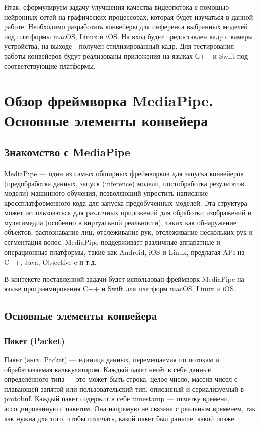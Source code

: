 \documentclass[a4paper,14pt]{extreport}
\begin{document}
    Итак, сформулируем задачу улучшения качества видеопотока с помощью нейронных сетей на графических процессорах, которая будет изучаться в данной работе. Необходимо разработать конвейеры для инференса выбранных моделей под платформы macOS, Linux и iOS. На вход будет предоставлен кадр с камеры устройства, на выходе - получен стилизированный кадр. Для тестирования работы конвейеров будут реализованы приложения на языках С++ и Swift под соответствующие платформы.

    \chapter{Обзор фреймворка MediaPipe. Основные элементы конвейера}
        \section{Знакомство с MediaPipe}
        MediaPipe — один из самых обширных фреймворков для запуска конвейеров (предобработка данных, запуск (inference) модели, постобработка результатов модели) машинного обучения, позволяющий упростить написание кроссплатформенного кода для запуска предобученных моделей. Эта структура может использоваться для различных приложений для обработки изображений и мультимедиа (особенно в виртуальной реальности), таких как обнаружение объектов, распознавание лиц, отслеживание рук, отслеживание нескольких рук и сегментация волос. MediaPipe поддерживает различные аппаратные и операционные платформы, такие как Android, iOS и Linux, предлагая API на C++, Java, Objective-c и т.д.

        В контексте поставленной задачи будет использован фреймворк MediaPipe на языке программирования C++ и Swift для платформ macOS, Linux и iOS.
        
        \section{Основные элементы конвейера}
        \subsection{Пакет (Packet)}
        Пакет (англ. Packet) — единица данных, перемещаемая по потокам и обрабатываемая калькулятором. Каждый пакет несёт в себе данные определённого типа — это может быть строка, целое число, массив чисел с плавающей запятой или пользовательский тип, описанный и сериализуемый в protobuf. Каждый пакет содержит в себе timestamp — отметку времени, ассоциированную с пакетом. Она напрямую не связана с реальным временем, так как нужна для того, чтобы отличать, какой пакет был раньше, какой позже. 
        
\end{document}
